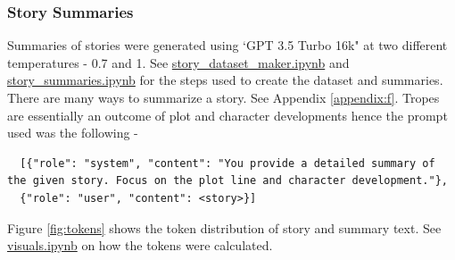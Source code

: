 \documentclass[11pt]{article}
\begin{document}
\subsubsection{Story Summaries}
Summaries of stories were generated using `GPT 3.5 Turbo 16k" at two different temperatures - 0.7 and 1. See \href{https://github.com/armsp/trama/blob/main/story_dataset_maker.ipynb}{story\_dataset\_maker.ipynb} and \href{https://github.com/armsp/trama/blob/main/story_summaries.ipynb}{story\_summaries.ipynb} for the steps used to create the dataset and summaries. There are many ways to summarize a story. See Appendix \ref{appendix:f}. Tropes are essentially an outcome of plot and character developments hence the prompt used was the following - 
\begin{lstlisting}
  [{"role": "system", "content": "You provide a detailed summary of the given story. Focus on the plot line and character development."},
  {"role": "user", "content": <story>}]
\end{lstlisting}
Figure \ref{fig:tokens} shows the token distribution of story and summary text. See \href{https://github.com/armsp/trama/blob/main/visuals.ipynb}{visuals.ipynb} on how the tokens were calculated.
\end{document}
